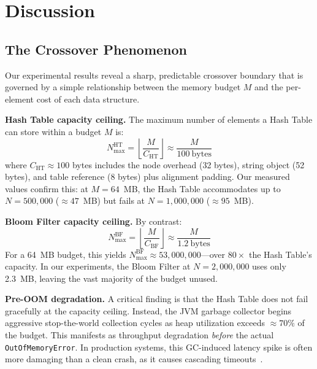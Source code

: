 \section{Discussion}
\label{sec:discussion}

\subsection{The Crossover Phenomenon}
\label{subsec:crossover_discussion}

Our experimental results reveal a sharp, predictable crossover boundary that is governed by a simple relationship between the memory budget $M$ and the per-element cost of each data structure.

\textbf{Hash Table capacity ceiling.} The maximum number of elements a Hash Table can store within a budget $M$ is:
\begin{equation}
    N_{\max}^{\text{HT}} = \left\lfloor \frac{M}{C_{\text{HT}}} \right\rfloor \approx \frac{M}{100~\text{bytes}}
    \label{eq:ht_capacity}
\end{equation}
where $C_{\text{HT}} \approx 100$ bytes includes the node overhead (32 bytes), string object (52 bytes), and table reference (8 bytes) plus alignment padding. Our measured values confirm this: at $M = 64$~MB, the Hash Table accommodates up to $N = 500{,}000$ ($\approx 47$~MB) but fails at $N = 1{,}000{,}000$ ($\approx 95$~MB).

\textbf{Bloom Filter capacity ceiling.} By contrast:
\begin{equation}
    N_{\max}^{\text{BF}} = \left\lfloor \frac{M}{C_{\text{BF}}} \right\rfloor \approx \frac{M}{1.2~\text{bytes}}
    \label{eq:bf_capacity}
\end{equation}
For a 64~MB budget, this yields $N_{\max}^{\text{BF}} \approx 53{,}000{,}000$---over $80\times$ the Hash Table's capacity. In our experiments, the Bloom Filter at $N = 2{,}000{,}000$ uses only 2.3~MB, leaving the vast majority of the budget unused.

\textbf{Pre-OOM degradation.} A critical finding is that the Hash Table does not fail gracefully at the capacity ceiling. Instead, the JVM garbage collector begins aggressive stop-the-world collection cycles as heap utilization exceeds ${\approx}70\%$ of the budget. This manifests as throughput degradation \emph{before} the actual \texttt{OutOfMemoryError}. In production systems, this GC-induced latency spike is often more damaging than a clean crash, as it causes cascading timeouts~\citep{jvmspec2023}.

